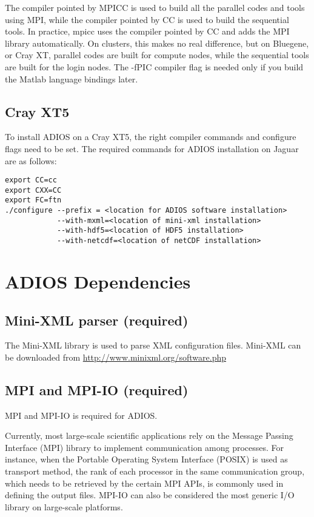 The compiler pointed by MPICC is used to build all the parallel codes and tools 
using MPI, while the compiler pointed by CC is used to build the sequential tools. 
In practice, mpicc uses the compiler pointed by CC and adds the MPI library automatically. 
On clusters, this makes no real difference, but on Bluegene, or Cray XT, parallel 
codes are built for compute nodes, while the sequential tools are built for the 
login nodes. The -fPIC compiler flag is needed only if you build the 
Matlab language bindings later.


\subsection{Cray XT5}

To install ADIOS on a Cray XT5, the right compiler commands and configure flags 
need to be set. The required commands for ADIOS installation on Jaguar are as follows:

\begin{lstlisting}
export CC=cc
export CXX=CC
export FC=ftn
./configure --prefix = <location for ADIOS software installation>
            --with-mxml=<location of mini-xml installation>
            --with-hdf5=<location of HDF5 installation>
            --with-netcdf=<location of netCDF installation>
\end{lstlisting}


\section{ADIOS Dependencies}

\subsection{Mini-XML parser (required)}

The Mini-XML library is used to parse XML configuration files. Mini-XML can be 
downloaded from \url{http://www.minixml.org/software.php}


\subsection{MPI and MPI-IO (required)}

MPI and MPI-IO is required for ADIOS.

Currently, most large-scale scientific applications rely on the Message Passing 
Interface (MPI) library to implement communication among processes. For instance, 
when the Portable Operating System Interface (POSIX) is used as transport method, 
the rank of each processor in the same communication group, which needs to be retrieved 
by the certain MPI APIs, is commonly used in defining the output files. MPI-IO 
can also be considered the most generic I/O library on large-scale platforms. 

